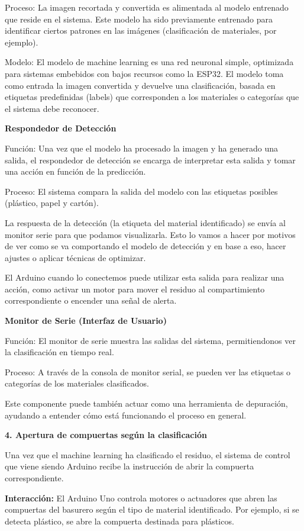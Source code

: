Proceso:
La imagen recortada y convertida es alimentada al modelo entrenado que reside en el sistema. Este modelo ha sido previamente entrenado para identificar ciertos patrones en las imágenes (clasificación de materiales, por ejemplo).

Modelo: El modelo de machine learning es una red neuronal simple, optimizada para sistemas embebidos con bajos recursos como la ESP32. El modelo toma como entrada la imagen convertida y devuelve una clasificación, basada en etiquetas predefinidas (labels) que corresponden a los materiales o categorías que el sistema debe reconocer.

\textbf{Respondedor de Detección}

Función: Una vez que el modelo ha procesado la imagen y ha generado una salida, el respondedor de detección se encarga de interpretar esta salida y tomar una acción en función de la predicción.

Proceso:
El sistema compara la salida del modelo con las etiquetas posibles (plástico, papel y cartón).

La respuesta de la detección (la etiqueta del material identificado) se envía al monitor serie para que podamos visualizarla.
Esto lo vamos a hacer por motivos de ver como se va comportando el modelo de detección y en base a eso, hacer ajustes o aplicar técnicas de optimizar.


El Arduino cuando lo conectemos puede utilizar esta salida para realizar una acción, como activar un motor para mover el residuo al compartimiento correspondiente o encender una señal de alerta.

\textbf{Monitor de Serie (Interfaz de Usuario)}

Función: El monitor de serie muestra las salidas del sistema, permitiendonos ver la clasificación en tiempo real.

Proceso:
A través de la consola de monitor serial, se pueden ver las etiquetas o categorías de los materiales clasificados.

Este componente puede también actuar como una herramienta de depuración, ayudando a entender cómo está funcionando el proceso en general.


	\textbf{4. Apertura de compuertas según la clasificación} 

Una vez que el machine learning ha clasificado el residuo, el sistema de control que viene siendo Arduino recibe la instrucción de abrir la compuerta correspondiente. 

    \textbf{Interacción:} El Arduino Uno controla motores o actuadores que abren las compuertas del basurero según el tipo de material identificado. Por ejemplo, si se detecta plástico, se abre la compuerta destinada para plásticos. 

